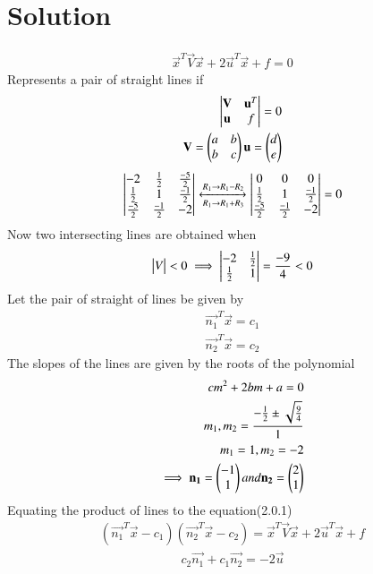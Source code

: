 \documentclass[journal,12pt,twocolumn]{IEEEtran}
\begin{document}
\section{Solution}
\begin{align}
\vec{x}^T\vec{V}\vec{x}+2\vec{u}^T\vec{x}+f=0
\end{align}
Represents a pair of straight lines if
\begin{align}
\begin{vmatrix}
\mathbf{V}&\mathbf{u}^T\\
\mathbf{u}&f\end{vmatrix} = 0\\
\mathbf{V}=\begin{pmatrix}a&b\\b&c\end{pmatrix}\mathbf{u}=\begin{pmatrix}d\\e\end{pmatrix}
\end{align}
\begin{align}
\begin{vmatrix}
-2&\frac{1}{2}&\frac{-5}{2}\\
\frac{1}{2}&1&\frac{-1}{2}\\
\frac{-5}{2}&\frac{-1}{2}&-2\end{vmatrix}
\xleftrightarrow[R_1\rightarrow R_1+R_3]{R_1\rightarrow R_1-R_2}
\begin{vmatrix}
0&0&0\\
\frac{1}{2}&1&\frac{-1}{2}\\
\frac{-5}{2}&\frac{-1}{2}&-2\end{vmatrix}=0
\end{align}
Now two intersecting lines are obtained when
\begin{align}
\begin{vmatrix}V\end{vmatrix} < 0 
\implies \begin{vmatrix}-2&\frac{1}{2}\\\frac{1}{2}&1\end{vmatrix}
=\frac{-9}{4} < 0
\end{align}
Let the pair of straight of lines be given by
\begin{align}
\vec{n_1}^T\vec{x}=c_1\\
\vec{n_2}^T\vec{x}=c_2
\end{align}
The slopes of the lines are given by the roots of the polynomial 
\begin{align}
cm^2+2bm+a=0 \\
m_1,m_2 = \frac{-\frac{1}{2}\pm\sqrt{\frac{9}{4}}}{1}\\
m_1= 1 , m_2 =-2\\
\implies\mathbf{n_1}=\begin{pmatrix}-1\\1\end{pmatrix} and \mathbf{n_2}=\begin{pmatrix}2\\1\end{pmatrix}
\end{align}
Equating the product of lines to the equation(2.0.1)
\begin{align}
(\vec{n_1}^T\vec{x}-c_1)(\vec{n_2}^T\vec{x}-c_2) =
\vec{x}^T\vec{V}\vec{x}+2\vec{u}^T\vec{x}+f 
\end{align}
\begin{align}
c_2\vec{n_1}+c_1\vec{n_2} =-2\vec{u}
 \end{align}
\end{document}

